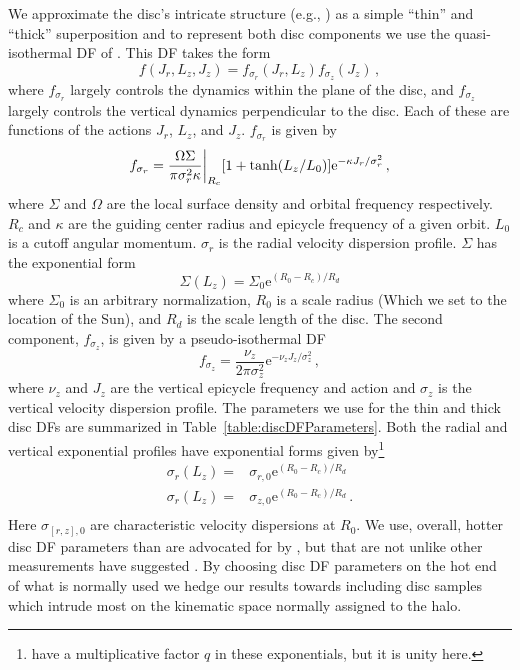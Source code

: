 We approximate the disc's intricate structure (e.g., \citealt{bovy12}) as a simple ``thin'' and ``thick'' superposition and to represent both disc components we use the quasi-isothermal DF of \citet{binney11} \citep[see also ][]{binney10}. This DF takes the form
\begin{equation}
    f(J_{r},L_{z},J_{z}) = f_{\sigma_{r}}(J_{r},L_{z})f_{\sigma_{z}}(J_{z})\,,
\end{equation}
where $f_{\sigma_{r}}$ largely controls the dynamics within the plane of the disc, and $f_{\sigma_{z}}$ largely controls the vertical dynamics perpendicular to the disc. Each of these are functions of the actions $J_{r}$, $L_{z}$, and $J_{z}$. $f_{\sigma_{r}}$ is given by
\begin{equation}
    f_{\sigma_{r}} = \frac{\Omega \Sigma}{ \pi \sigma_{r}^{2} \kappa } \bigg \rvert_{\small{R_{c}}} [1 + \tanh(L_{z}/L_{0})] \mathrm{e}^{-\kappa J_{r} / \sigma_{r}^{2}}\,,
\end{equation}
where $\Sigma$ and $\Omega$ are the local surface density and orbital frequency respectively. $R_{c}$ and $\kappa$ are the guiding center radius and epicycle frequency of a given orbit. $L_{0}$ is a cutoff angular momentum. $\sigma_{r}$ is the radial velocity dispersion profile. $\Sigma$ has the exponential form
\begin{equation}
    \Sigma(L_{z}) = \Sigma_{0} \mathrm{e}^{(R_{0}-R_{c})/R_{d}}
\end{equation}
where $\Sigma_{0}$ is an arbitrary normalization, $R_{0}$ is a scale radius (Which we set to the location of the Sun), and $R_{d}$ is the scale length of the disc.
The second component, $f_{\sigma_{z}}$, is given by a pseudo-isothermal DF
\begin{equation}
    f_{\sigma_{z}} =  \frac{\nu_{z}}{2\pi \sigma_{z}^{2}} \mathrm{e}^{-\nu_{z} J_{z}/\sigma_{z}^{2}}\,,
\end{equation}
where $\nu_{z}$ and $J_{z}$ are the vertical epicycle frequency and action and $\sigma_{z}$ is the vertical velocity dispersion profile. The parameters we use for the thin and thick disc DFs are summarized in Table~\ref{table:discDFParameters}. Both the radial and vertical exponential profiles have exponential forms given by\footnote{\citet{binney11} have a multiplicative factor $q$ in these exponentials, but it is unity here.}
\begin{equation}
    \begin{split}
        \nonumber \sigma_{r}(L_{z}) = & \sigma_{r,0} \mathrm{e}^{(R_{0}-R_{c})/R_{d}} \\
        \sigma_{r}(L_{z}) = & \sigma_{z,0} \mathrm{e}^{(R_{0}-R_{c})/R_{d}}\,. \\
    \end{split}
\end{equation}
Here $\sigma_{[r,z],0}$ are characteristic velocity dispersions at $R_{0}$. We use, overall, hotter disc DF parameters than are advocated for by \citet{binney11}, but that are not unlike other measurements have suggested \citep[e.g. ][]{bovy12,mackereth19b}. By choosing disc DF parameters on the hot end of what is normally used we hedge our results towards including disc samples which intrude most on the kinematic space normally assigned to the halo.

